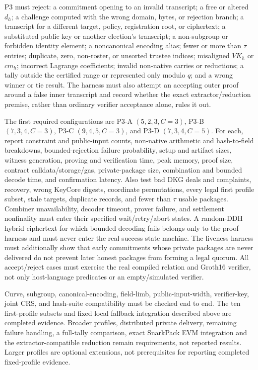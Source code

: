 \documentclass[pdflatex,sn-mathphys-num]{sn-jnl}%
\theoremstyle{thmstyleone}%
\theoremstyle{thmstyletwo}%
\theoremstyle{thmstylethree}%
\begin{document}
P3 must reject: a commitment opening to an invalid transcript; a free or
altered $d_h$; a challenge computed with the wrong domain, bytes, or rejection
branch; a transcript for a different target, policy, registration root, or
ciphertext; a substituted public key or another election's transcript; a
non-subgroup or forbidden identity element; a noncanonical
encoding alias; fewer or more than $\tau$ entries; duplicate, zero, non-roster,
or unsorted trustee indices; misaligned $VK_h$ or $cm_h$; incorrect Lagrange
coefficients; invalid non-native carries or reductions; a tally outside the
certified range or represented only modulo $q$; and a wrong winner or tie
result.  The harness must also attempt an accepting outer proof around a false
inner transcript and record whether the exact extractor/reduction premise,
rather than ordinary verifier acceptance alone, rules it out.

The first required configurations are P3-A $(5,2,3,C=3)$, P3-B
$(7,3,4,C=3)$, P3-C $(9,4,5,C=3)$, and P3-D $(7,3,4,C=5)$.  For each, report
constraint and public-input counts, non-native arithmetic and hash-to-field
breakdowns, bounded-rejection failure probability, setup and artifact sizes,
witness generation, proving and verification time, peak memory, proof size,
contract calldata/storage/gas, private-package size, combination and bounded
decode time, and confirmation latency.  Also test bad DKG deals and complaints,
recovery, wrong KeyCore digests, coordinate permutations, every legal first
profile subset, stale targets, duplicate records, and fewer than $\tau$ usable
packages.  Combiner unavailability, decoder timeout, prover failure, and
settlement nonfinality must enter their specified wait/retry/abort states.  A
random-DDH hybrid ciphertext for which bounded decoding fails belongs only to
the proof harness and must never enter the real success state machine.
The liveness harness must additionally show that early commitments whose
private packages are never delivered do not prevent later honest packages
from forming a legal quorum.  All accept/reject cases must exercise the real
compiled relation and Groth16 verifier, not only host-language predicates or
an empty/simulated verifier.

Curve, subgroup, canonical-encoding, field-limb, public-input-width,
verifier-key, joint CRS, and hash-suite compatibility must be checked end to
end. The ten first-profile subsets and fixed local fallback integration
described above are completed evidence. Broader profiles, distributed private
delivery, remaining failure handling, a full-tally comparison, exact SnarkPack
EVM integration and the extractor-compatible reduction remain requirements,
not reported results. Larger profiles are optional extensions, not prerequisites
for reporting completed fixed-profile evidence.
\end{document}
